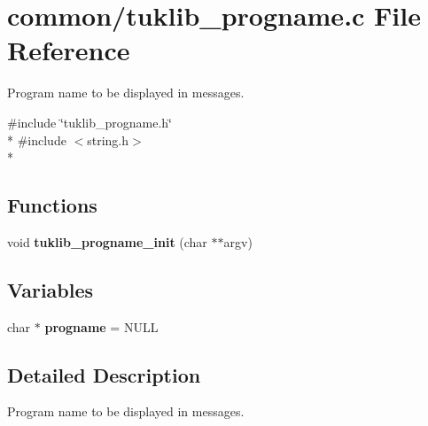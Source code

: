 \section{common/tuklib\-\_\-progname.c File Reference}
\label{tuklib__progname_8c}


Program name to be displayed in messages.  


{\ttfamily \#include \char`\"{}tuklib\-\_\-progname.\-h\char`\"{}}\\*
{\ttfamily \#include $<$string.\-h$>$}\\*
\subsection*{Functions}
\begin{DoxyCompactItemize}
\item 
void {\bfseries tuklib\-\_\-progname\-\_\-init} (char $\ast$$\ast$argv)\label{tuklib__progname_8c_a2d6344889dbe31cea9e5574f671e55dc}

\end{DoxyCompactItemize}
\subsection*{Variables}
\begin{DoxyCompactItemize}
\item 
char $\ast$ {\bfseries progname} = N\-U\-L\-L\label{tuklib__progname_8c_ab9e1449fd00c98428516f0b41eddcb10}

\end{DoxyCompactItemize}


\subsection{Detailed Description}
Program name to be displayed in messages. 